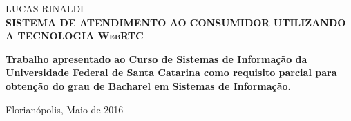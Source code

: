 
\begin{center}

    {\large LUCAS RINALDI\\}
    \vspace{8cm}
    {\Large \textsc\textbf{{SISTEMA DE ATENDIMENTO AO CONSUMIDOR UTILIZANDO A TECNOLOGIA WebRTC} }\\}
    \vspace{1cm}
    \hspace{.45\linewidth}
    \begin{minipage}{.50\linewidth}

            \textbf{Trabalho apresentado ao Curso de Sistemas de Informação da Universidade Federal de Santa Catarina como requisito parcial para obtenção do grau de Bacharel em Sistemas de Informação.}

           
    
    \end{minipage}

    \vspace{2cm}
    \vfill
    {\large Florianópolis, Maio de 2016}
\end{center}

